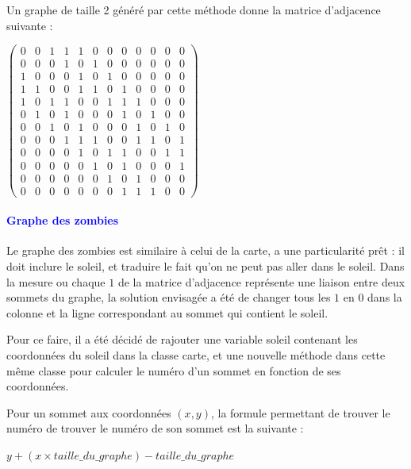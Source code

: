 \documentclass{report}
\begin{document}
			Un graphe de taille 2 généré par cette méthode donne la matrice d'adjacence suivante : 
			\\
			\begin{center}
			\setcounter{MaxMatrixCols}{12}
$					\begin{pmatrix}
			0&0&1&1&1&0&0&0&0&0&0&0\\
			0&0&0&1&0&1&0&0&0&0&0&0\\
			1&0&0&0&1&0&1&0&0&0&0&0\\
			1&1&0&0&1&1&0&1&0&0&0&0\\
			1&0&1&1&0&0&1&1&1&0&0&0\\
			0&1&0&1&0&0&0&1&0&1&0&0\\
			0&0&1&0&1&0&0&0&1&0&1&0\\
			0&0&0&1&1&1&0&0&1&1&0&1\\
			0&0&0&0&1&0&1&1&0&0&1&1\\
			0&0&0&0&0&1&0&1&0&0&0&1\\
			0&0&0&0&0&0&1&0&1&0&0&0\\
			0&0&0&0&0&0&0&1&1&1&0&0		
				\end{pmatrix}$
			\end{center}								
			

			
			\paragraph{\textcolor{blue}{Graphe des zombies}}
				
				Le graphe des zombies est similaire à celui de la carte, a une particularité prêt : il doit inclure le soleil, et traduire le fait qu'on ne peut pas aller dans le soleil. Dans la mesure ou chaque  $1$ de la matrice d'adjacence représente une liaison entre deux sommets du graphe, la solution envisagée a été de changer tous les $1$ en $0$ dans la colonne et la ligne correspondant au sommet qui contient le soleil.
				
				Pour ce faire, il a été décidé de rajouter une variable soleil contenant les coordonnées du soleil dans la classe carte, et une nouvelle méthode dans cette même classe pour calculer le numéro d'un sommet en fonction de ses coordonnées.
				
				Pour un sommet aux coordonnées $(x,y)$, la formule permettant de trouver le numéro de trouver le numéro de son sommet est la suivante :
				
				\begin{center}
				 $ y+(x\times taille\_du\_graphe) - taille\_du\_graphe$			
				 \end{center}
	
\end{document}
